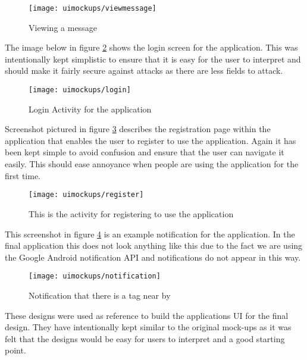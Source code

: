 \begin{figure}[H]
    \centering
    \texttt{[image: uimockups/viewmessage]}
    \caption{Viewing a message}
    \label{fig:viewing_message_image}
\end{figure} 

\noindent
The image below in figure \ref{fig:login_activity_image} shows the login screen for the application. This was intentionally kept simplistic to ensure that it is easy for the user to interpret and should make it fairly secure against attacks as there are less fields to attack.\\

\begin{figure}[H]
    \centering
    \texttt{[image: uimockups/login]}
    \caption{Login Activity for the application}
    \label{fig:login_activity_image}
\end{figure} 

\noindent
Screenshot pictured in figure \ref{fig:registration_activity_image} describes the registration page within the application that enables the user to register to use the application. Again it has been kept simple to avoid confusion and ensure that the user can navigate it easily. This should ease annoyance when people are using the application for the first time.\\

\begin{figure}[H]
    \centering
    \texttt{[image: uimockups/register]}
    \caption{This is the activity for registering to use the application}
    \label{fig:registration_activity_image}
\end{figure} 

\noindent
This screenshot in figure \ref{fig:notification_image} is an example notification for the application. In the final application this does not look anything like this due to the fact we are using the Google Android notification API and notifications do not appear in this way.\\

\begin{figure}[H]
    \centering
    \texttt{[image: uimockups/notification]}
    \caption{Notification that there is a tag near by}
    \label{fig:notification_image}
\end{figure} 

\noindent
These designs were used as reference to build the applications UI for the final design. They have intentionally kept similar to the original mock-ups as it was felt that the designs would be easy for users to interpret and a good starting point.\\

